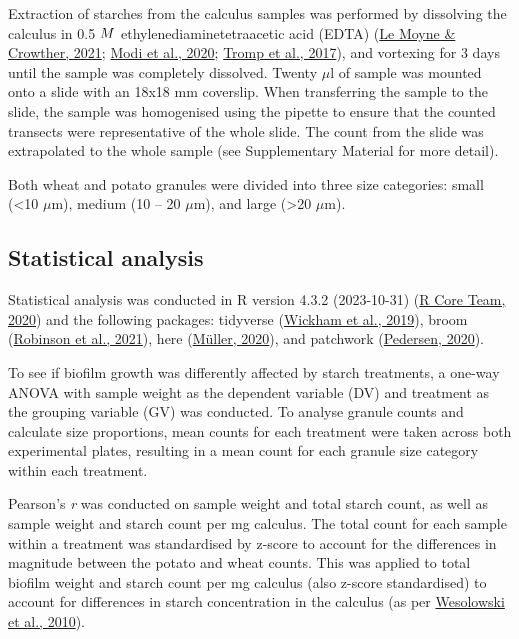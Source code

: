 \documentclass[
  b5paper,
]{book}
\begin{document}
Extraction of starches from the calculus samples was performed by
dissolving the calculus in 0.5 \(\tiny{M}\) ethylenediaminetetraacetic
acid (EDTA) (\protect\hyperlink{ref-lemoyneCalculusPretreatments2021}{Le
Moyne \& Crowther, 2021};
\protect\hyperlink{ref-modiCalculusMethodologies2020}{Modi et al.,
2020}; \protect\hyperlink{ref-trompEDTACalculus2017}{Tromp et al.,
2017}), and vortexing for 3 days until the sample was completely
dissolved. Twenty \(\mu\)l of sample was mounted onto a slide with an
18x18 mm coverslip. When transferring the sample to the slide, the
sample was homogenised using the pipette to ensure that the counted
transects were representative of the whole slide. The count from the
slide was extrapolated to the whole sample (see Supplementary Material
for more detail).

Both wheat and potato granules were divided into three size categories:
small (\textless10 \(\mu\)m), medium (10 -- 20 \(\mu\)m), and large
(\textgreater20 \(\mu\)m).

\hypertarget{statistical-analysis}{%
\subsection{Statistical analysis}\label{statistical-analysis}}

Statistical analysis was conducted in R version 4.3.2 (2023-10-31)
(\protect\hyperlink{ref-Rbase}{R Core Team, 2020}) and the following
packages: tidyverse (\protect\hyperlink{ref-tidyverse2019}{Wickham et
al., 2019}), broom (\protect\hyperlink{ref-Rbroom}{Robinson et al.,
2021}), here (\protect\hyperlink{ref-Rhere}{Müller, 2020}), and
patchwork (\protect\hyperlink{ref-Rpatchwork}{Pedersen, 2020}).

To see if biofilm growth was differently affected by starch treatments,
a one-way ANOVA with sample weight as the dependent variable (DV) and
treatment as the grouping variable (GV) was conducted. To analyse
granule counts and calculate size proportions, mean counts for each
treatment were taken across both experimental plates, resulting in a
mean count for each granule size category within each treatment.

Pearson's \emph{r} was conducted on sample weight and total starch
count, as well as sample weight and starch count per mg calculus. The
total count for each sample within a treatment was standardised by
z-score to account for the differences in magnitude between the potato
and wheat counts. This was applied to total biofilm weight and starch
count per mg calculus (also z-score standardised) to account for
differences in starch concentration in the calculus (as per
\protect\hyperlink{ref-wesolowskiEvaluatingMicrofossil2010}{Wesolowski
et al., 2010}).
\end{document}
